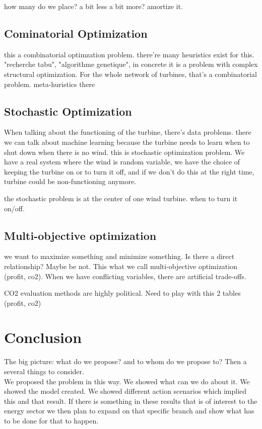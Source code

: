 \documentclass[12pt]{article}
\begin{document}
how many do we place? a bit less a bit more? amortize it.

\subsection{Cominatorial Optimization}
this a combinatorial optimzation problem. there're many heuristics exist for this. 
"recherche tabu", "algorithme genetique", in concrete it is a problem with complex
structural optimization. 
For the whole network of turbines, that's a combinatorial problem. meta-huristics there


\subsection{Stochastic Optimization}
When talking about the functioning of the turbine, there's data problems.
there we can talk about machine learning because the turbine needs to learn when to shut down when there is no wind. this is stochastic optimization problem. We have a real 
system where the wind is random variable, we have the choice of keeping the turbine on or to turn it off, and if we don't do this at the right time, turbine could be non-functioning anymore. 

the stochastic problem is at the center of one wind turbine. when to turn it on/off.

\subsection{Multi-objective optimization}
we want to maximize something and minimize something. Is there a direct relationship?
Maybe be not. This what we call multi-objective optimization (profit, co2). When we have conflicting variables, there are artificial trade-offs. 

CO2 evaluation methods are highly political. Need to play with this 2 tables (profit, co2)

\section{Conclusion}
The big picture: what do we propose? and to whom do we propose to? Then a several things to consider. \\

We proposed the problem in this way. We showed what can we do about it. We showed the model created. We showed different action scenarios which implied this and that result. If there is something in these results that is of interest to the energy sector we then plan to expand on that specific branch and show what has to be done for that to happen.\\  
\end{document}
